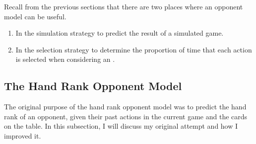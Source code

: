 Recall from the previous sections that there are two places where an opponent model can be useful. 
\begin{enumerate}
\item In the simulation strategy to predict the result of a simulated game. 
\item In the selection strategy to determine the proportion of time that each action is selected when considering an \opp.
\end{enumerate}



\subsection{The Hand Rank Opponent Model}			%



The original purpose of the hand rank opponent model was to predict the hand rank of an opponent, given their past actions in the current game and the cards on the table.
In this subsection, I will discuss my original attempt and how I improved it.


